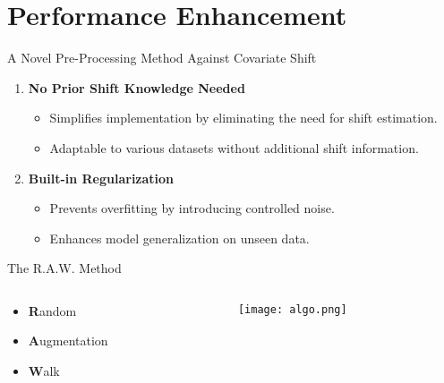\section{Performance Enhancement}



\begin{frame}{A Novel Pre-Processing Method Against Covariate Shift}
    \begin{enumerate}
        \item \textbf{No Prior Shift Knowledge Needed}
        \begin{itemize}
            \item Simplifies implementation by eliminating the need for shift estimation.
            \item Adaptable to various datasets without additional shift information.
        \end{itemize}
        
        \item \textbf{Built-in Regularization}
        \begin{itemize}
            \item Prevents overfitting by introducing controlled noise.
            \item Enhances model generalization on unseen data.
        \end{itemize}
    \end{enumerate}
\end{frame}



\begin{frame}{The R.A.W. Method}
    \begin{columns}[T]

        \begin{column}{0.45\textwidth}
            \vspace{2em} 
                \begin{itemize}\LARGE
                    \item \textbf{R}andom
                    \item \textbf{A}ugmentation
                    \item \textbf{W}alk
                \end{itemize}
   
        \end{column}
        
        \vline\hspace{1em} 
        \begin{column}{0.55\textwidth}
        \begin{figure}
            
            \texttt{[image: algo.png]}
            
        \end{figure}
        \end{column}
    \end{columns}
\end{frame}



